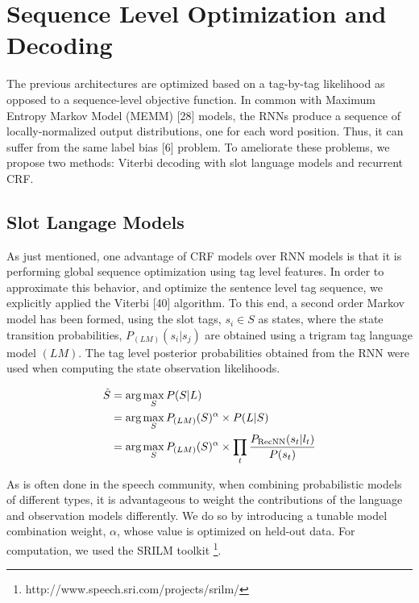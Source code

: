 \section{Sequence Level Optimization and Decoding} \label{sec:slod}

The previous architectures are optimized based on a tag-by-tag likelihood as
opposed to a sequence-level objective function. In common with Maximum Entropy
Markov Model (MEMM) [28] models, the RNNs produce a sequence of
locally-normalized output distributions, one for each word position. Thus, it
can suffer from the same label bias [6] problem. To ameliorate these problems,
we propose two methods: Viterbi decoding with slot language models and
recurrent CRF.

\subsection{Slot Langage Models}

As just mentioned, one advantage of CRF models over RNN models is that it is
performing global sequence optimization using tag level features. In order to
approximate this behavior, and optimize the sentence level tag sequence, we
explicitly applied the Viterbi [40] algorithm. To this end, a second order
Markov model has been formed, using the slot tags, $s_{i}\in S$ as states, where the
state transition probabilities, $P_{(LM)}  (s_{i}\vert s_{j} )$ are obtained using a trigram
tag language model $(LM)$. The tag level posterior probabilities obtained from
the RNN were used when computing the state observation likelihoods.

\begin{align*}
\centering
\hat{S} & =  \textrm{arg}\max_{S} P(S\vert L) \\
& =  \textrm{arg}\max_{S} P_{(LM)}(S)^{\alpha}\times P(L \vert S)\\
& =  \textrm{arg}\max_{S} P_{(LM)}(S)^{\alpha}\times \prod_{t} \frac{P_{\textrm{RecNN}}(s_{t}\vert l_{t})}{P(s_{t})}
\end{align*}

As is often done in the speech community, when combining probabilistic models
of different types, it is advantageous to weight the contributions of the
language and observation models differently. We do so by introducing a tunable
model combination weight, $\alpha$, whose value is optimized on held-out data. For
computation, we used the SRILM toolkit
\footnote{http://www.speech.sri.com/projects/srilm/}.

